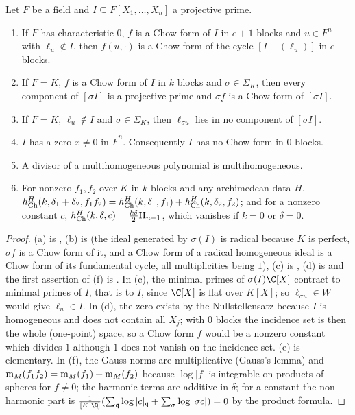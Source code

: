 \begin{lemma}\label{pf:covol:lem:chowcalc}
Let $F$ be a field and $I\subseteq F[X_1,\dots,X_n]$ a projective prime.
\begin{enumerate}[label=(\alph*)]
\item If $F$ has characteristic $0$, $f$ is a Chow form of $I$ in $e+1$ blocks and $u\in F^n$ with
  $\ell_u\notin I$, then $f(u,\cdot)$ is a Chow form of the cycle $[I+(\ell_u)]$ in $e$ blocks.
\item If $F=K$, $f$ is a Chow form of $I$ in $k$ blocks and $\sigma\in\Sigma_K$, then every
  component of $[\sigma I]$ is a projective prime and $\sigma f$ is a Chow form of $[\sigma I]$.
\item If $F=K$, $\ell_u\notin I$ and $\sigma\in\Sigma_K$, then $\ell_{\sigma u}$ lies in no component of
  $[\sigma I]$.
\item $I$ has a zero $x\ne0$ in $\overline F^n$. Consequently $I$ has no Chow form in $0$ blocks.
\item A divisor of a multihomogeneous polynomial is multihomogeneous.
\item For nonzero $f_1,f_2$ over $K$ in $k$ blocks and any archimedean data $H$,
  $h_{\mathrm{Ch}}^H(k,\delta_1+\delta_2,f_1f_2)=h_{\mathrm{Ch}}^H(k,\delta_1,f_1)+h_{\mathrm{Ch}}^H(k,\delta_2,f_2)$;
  and for a nonzero constant $c$, $h_{\mathrm{Ch}}^H(k,\delta,c)=\frac{k\delta}2\mathrm{H}_{n-1}$, which vanishes
  if $k=0$ or $\delta=0$.
\end{enumerate}
\end{lemma}

\begin{proof}
(a) is , (b) is
 (the ideal generated by $\sigma(I)$ is
radical because $K$ is perfect, $\sigma f$ is a Chow form of it, and a Chow form of a radical homogeneous
ideal is a Chow form of its fundamental cycle, all multiplicities being $1$), (c) is
, (d) is
 and the first assertion of (f) is
. In (c), the minimal primes of
$\sigma(I)\C[X]$ contract to minimal primes of $I$, that is to $I$, since $\C[X]$ is flat over $K[X]$;
so $\ell_{\sigma u}\in W$ would give $\ell_u\in I$. In (d), the zero exists by the Nullstellensatz because
$I$ is homogeneous and does not contain all $X_j$; with $0$ blocks the incidence set is then the whole
(one-point) space, so a Chow form $f$ would be a nonzero constant which divides $1$ although $1$ does not
vanish on the incidence set. (e) is elementary. In (f), the Gauss norms are multiplicative (Gauss's lemma)
and $\operatorname{m}_M(f_1f_2)=\operatorname{m}_M(f_1)+\operatorname{m}_M(f_2)$ because $\log|f|$ is integrable on products of
spheres for $f\ne0$; the harmonic terms are additive in $\delta$; for a constant the non-harmonic part is
$\frac1{[K:\Q]}(\sum_{\mathfrak q}\log|c|_{\mathfrak q}+\sum_\sigma\log|\sigma c|)=0$ by the product
formula.
\end{proof}

